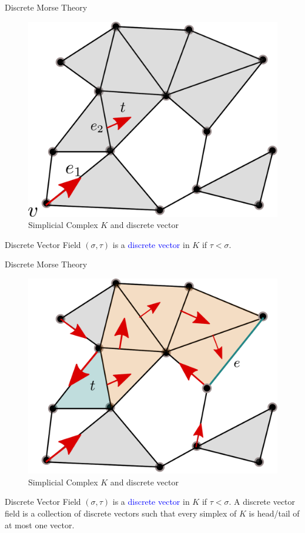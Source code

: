 \documentclass[9pt,sans-serif]{beamer}
\begin{document}
\begin{frame}{Discrete Morse Theory}
 \begin{figure}[htb]
    \centering \includegraphics[scale=0.3]{vector}
    \caption{Simplicial Complex $K$ and discrete vector}
  \end{figure}

 \begin{block}{Discrete Vector Field}
   $(\sigma,\tau)$ is a \textcolor{blue}{discrete vector} in $K$ if
   $\tau<\sigma$. 
 \end{block}
\end{frame}

\begin{frame}{Discrete Morse Theory}
 \begin{figure}[htb]
    \centering \includegraphics[scale=0.3]{vpath}
    \caption{Simplicial Complex $K$ and discrete vector}
  \end{figure}

 \begin{block}{Discrete Vector Field}
   $(\sigma,\tau)$ is a \textcolor{blue}{discrete vector} in $K$ if
   $\tau<\sigma$.  A discrete vector field is a collection of discrete vectors
   such that every simplex of $K$ is head/tail of at most one vector. 
 \end{block}
\end{frame}
\end{document}
